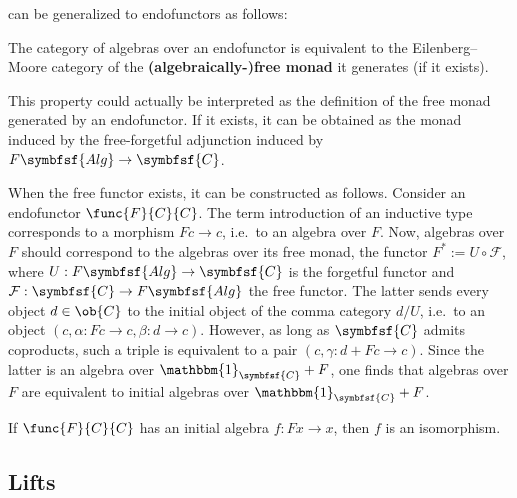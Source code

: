      can be generalized to endofunctors as follows:
    \begin{property}\label{cat:algebraically_free_monad}
        The category of algebras over an endofunctor is equivalent to the Eilenberg--Moore category of the \textbf{(algebraically-)free monad} it generates (if it exists).
    \end{property}
    \begin{construct}
        This property could actually be interpreted as the definition of the free monad generated by an endofunctor. If it exists, it can be obtained as the monad induced by the free-forgetful adjunction induced by $F\symbfsf{Alg}\rightarrow\symbfsf{C}$.

        When the free functor exists, it can be constructed as follows. Consider an endofunctor $\func{F}{C}{C}$. The term introduction of an inductive type corresponds to a morphism $Fc\rightarrow c$, i.e.~to an algebra over $F$. Now, algebras over $F$ should correspond to the algebras over its free monad, the functor $F^*:=U\circ\mathcal{F}$, where $U:F\symbfsf{Alg}\rightarrow\symbfsf{C}$ is the forgetful functor and $\mathcal{F}:\symbfsf{C}\rightarrow F\symbfsf{Alg}$ the free functor. The latter sends every object $d\in\ob{C}$ to the initial object of the comma category $d/U$, i.e.~to an object $(c,\alpha: Fc\rightarrow c,\beta:d\rightarrow c)$. However, as long as $\symbfsf{C}$ admits coproducts, such a triple is equivalent to a pair $(c,\gamma:d+Fc\rightarrow c)$. Since the latter is an algebra over $\mathbbm{1}_{\symbfsf{C}}+F$, one finds that algebras over $F$ are equivalent to initial algebras over $\mathbbm{1}_{\symbfsf{C}}+F$.
    \end{construct}

    \begin{theorem}[Lambek]
        If $\func{F}{C}{C}$ has an initial algebra $f:Fx\rightarrow x$, then $f$ is an isomorphism.
    \end{theorem}

\subsection{Lifts}

